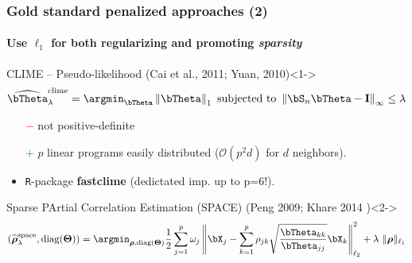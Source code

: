 \begin{frame}
  \frametitle{Gold standard penalized approaches (2)}
  \framesubtitle{Use $\ell_1$ for both regularizing and promoting \textit{sparsity}}

  \begin{overlayarea}{\textwidth}{\textheight}
        
    \begin{block}{CLIME -- Pseudo-likelihood  (Cai et al., 2011;
        Yuan, 2010)}<1->
      \vspace*{-1.5em}
      \begin{equation*}
        \widehat{\invcov}^{\text{clime}}_\lambda  = \argmin_{\invcov}
        \left\|   \invcov \right\|_1 \text{ subjected to }
        \left\|   \empcov \invcov - \mathbf{I} \right\|_\infty\leq \lambda
      \end{equation*}
      \vspace*{-1.5em}
    \end{block}
    
    \begin{itemize}
    \item[\textcolor{red}{$-$}] not positive-definite
    \item[\textcolor{green}{$+$}]  $p$ linear  programs easily
      distributed ($\mathcal{O}(p^2d)$ for $d$ neighbors).
    \item \texttt{R}-package \textbf{fastclime} (dedictated imp. up to p=6!).
    \end{itemize}

      \vspace*{-.5em}
    
    \begin{block}{Sparse PArtial  Correlation Estimation (SPACE)
        (Peng 2009; Khare 2014 )}<2-> 
      \vspace*{-2em}
      \begin{equation*}
        \left(\widehat{\boldsymbol\rho}_\lambda^{\text{space}}, \mathrm{diag}({\boldsymbol\Theta})\right) =
        \argmin_{\boldsymbol\rho,\mathrm{diag}({\boldsymbol\Theta})} \frac{1}{2}
        \sum_{j=1}^p \omega_j \left\|
          \bX_j - \sum_{k=1}^p \rho_{jk} \sqrt{\frac{{\invcov}_{kk}}{{\invcov}_{jj}}}
          \bX_k \right\|_{\ell_2}^2 + \lambda\ \| \boldsymbol\rho \|_{\ell_1}
      \end{equation*}
      \vspace*{-1.5em}
    \end{block}
    
      
\end{overlayarea}      

\end{frame}

